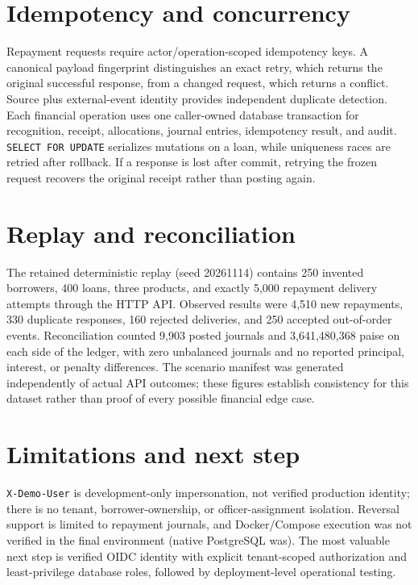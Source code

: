 \documentclass[10pt,a4paper]{article}
\begin{document}
\section{Idempotency and concurrency}
Repayment requests require actor/operation-scoped idempotency keys. A canonical payload
fingerprint distinguishes an exact retry, which returns the original successful response,
from a changed request, which returns a conflict. Source plus external-event identity provides
independent duplicate detection. Each financial operation uses one caller-owned database
transaction for recognition, receipt, allocations, journal entries, idempotency result, and
audit. \texttt{SELECT FOR UPDATE} serializes mutations on a loan, while uniqueness races are
retried after rollback. If a response is lost after commit, retrying the frozen request recovers
the original receipt rather than posting again.

\section{Replay and reconciliation}
The retained deterministic replay (seed 20261114) contains 250 invented borrowers, 400 loans,
three products, and exactly 5,000 repayment delivery attempts through the HTTP API. Observed
results were 4,510 new repayments, 330 duplicate responses, 160 rejected deliveries, and 250
accepted out-of-order events. Reconciliation counted 9,903 posted journals and
3,641,480,368 paise on each side of the ledger, with zero unbalanced journals and no reported
principal, interest, or penalty differences. The scenario manifest was generated independently
of actual API outcomes; these figures establish consistency for this dataset rather than proof
of every possible financial edge case.

\section{Limitations and next step}
\texttt{X-Demo-User} is development-only impersonation, not verified production identity;
there is no tenant, borrower-ownership, or officer-assignment isolation. Reversal support is
limited to repayment journals, and Docker/Compose execution was not verified in the final
environment (native PostgreSQL was). The most valuable next step is verified OIDC identity
with explicit tenant-scoped authorization and least-privilege database roles, followed by
deployment-level operational testing.
\end{document}
